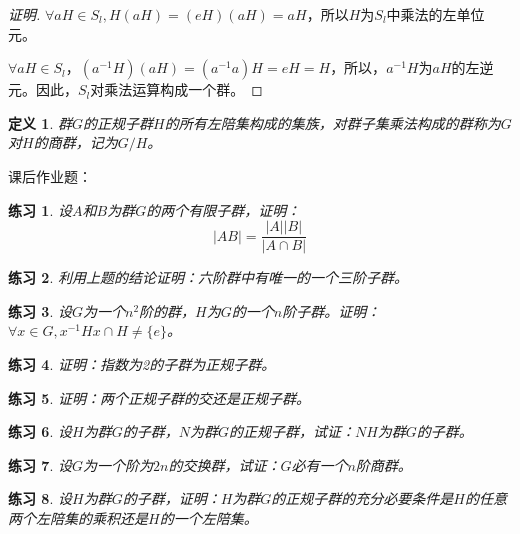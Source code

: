 \documentclass{article}
\newtheorem{Def}{定义}
\newtheorem{Exercise}{练习}
\begin{document}
\begin{CJK*}{UTF8}{gbsn}
\begin{proof}[证明]
  $\forall aH\in S_l,H(aH)=(eH)(aH)=aH$，所以$H$为$S_l$中乘法的左单位元。

  $\forall aH\in S_l$，$(a^{-1}H)(aH)=(a^{-1}a)H=eH=H$，所以，$a^{-1}H$为$aH$的左逆元。因此，$S_l$对乘法运算构成一个群。
\end{proof}
\begin{Def}
  群$G$的正规子群$H$的所有左陪集构成的集族，对群子集乘法构成的群称为$G$对$H$的商群，记为$G/H$。
\end{Def}


课后作业题：
\begin{Exercise}
设$A$和$B$为群$G$的两个有限子群，证明：
\[|AB|=\frac{|A||B|}{|A\cap B|}\]
\end{Exercise}
\begin{Exercise}
  利用上题的结论证明：六阶群中有唯一的一个三阶子群。
\end{Exercise}
\begin{Exercise}
设$G$为一个$n^2$阶的群，$H$为$G$的一个$n$阶子群。证明：$\forall x\in G, x^{-1}Hx\cap H \neq \{e\}$。
\end{Exercise}
\begin{Exercise}
证明：指数为2的子群为正规子群。
\end{Exercise}
\begin{Exercise}
证明：两个正规子群的交还是正规子群。
\end{Exercise}
\begin{Exercise}
设$H$为群$G$的子群，$N$为群$G$的正规子群，试证：$NH$为群$G$的子群。
\end{Exercise}
\begin{Exercise}
设$G$为一个阶为$2n$的交换群，试证：$G$必有一个$n$阶商群。
\end{Exercise}
\begin{Exercise}
设$H$为群$G$的子群，证明：$H$为群$G$的正规子群的充分必要条件是$H$的任意两个左陪集的乘积还是$H$的一个左陪集。
\end{Exercise}
\end{CJK*}
\end{document}
